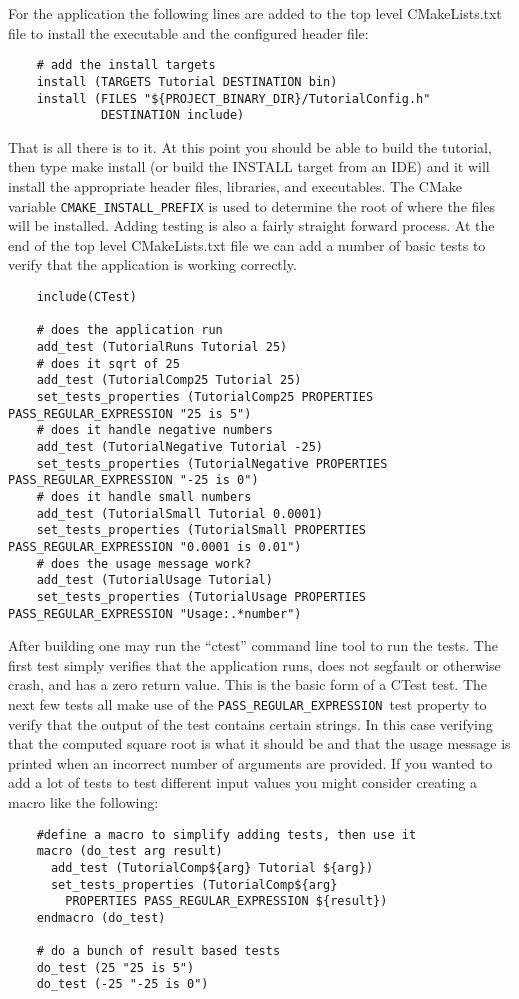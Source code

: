 \documentclass[UTF8,a4paper,8pt]{ctexart}
\begin{document}
	For the application the following lines are added to the top level CMakeLists.txt file to install the executable and the configured header file:
	\begin{lstlisting}
	# add the install targets
	install (TARGETS Tutorial DESTINATION bin)
	install (FILES "${PROJECT_BINARY_DIR}/TutorialConfig.h"        
	         DESTINATION include)
	\end{lstlisting}	

	That is all there is to it. At this point you should be able to build the tutorial, then type make install (or build the INSTALL target from an IDE) and it will install the appropriate header files, libraries, and executables. The CMake variable \verb|CMAKE_INSTALL_PREFIX| is used to determine the root of where the files will be installed. Adding testing is also a fairly straight forward process. At the end of the top level CMakeLists.txt file we can add a number of basic tests to verify that the application is working correctly.
	\begin{lstlisting}
	include(CTest)
	
	# does the application run
	add_test (TutorialRuns Tutorial 25)
	# does it sqrt of 25
	add_test (TutorialComp25 Tutorial 25)
	set_tests_properties (TutorialComp25 PROPERTIES PASS_REGULAR_EXPRESSION "25 is 5")
	# does it handle negative numbers
	add_test (TutorialNegative Tutorial -25)
	set_tests_properties (TutorialNegative PROPERTIES PASS_REGULAR_EXPRESSION "-25 is 0")
	# does it handle small numbers
	add_test (TutorialSmall Tutorial 0.0001)
	set_tests_properties (TutorialSmall PROPERTIES PASS_REGULAR_EXPRESSION "0.0001 is 0.01")
	# does the usage message work?
	add_test (TutorialUsage Tutorial)
	set_tests_properties (TutorialUsage PROPERTIES PASS_REGULAR_EXPRESSION "Usage:.*number")
	\end{lstlisting}	

	
	After building one may run the “ctest” command line tool to run the tests. The first test simply verifies that the application runs, does not segfault or otherwise crash, and has a zero return value. This is the basic form of a CTest test. The next few tests all make use of the \verb|PASS_REGULAR_EXPRESSION |test property to verify that the output of the test contains certain strings. In this case verifying that the computed square root is what it should be and that the usage message is printed when an incorrect number of arguments are provided. If you wanted to add a lot of tests to test different input values you might consider creating a macro like the following:
	\begin{lstlisting}
	#define a macro to simplify adding tests, then use it
	macro (do_test arg result)
	  add_test (TutorialComp${arg} Tutorial ${arg})
	  set_tests_properties (TutorialComp${arg}
	    PROPERTIES PASS_REGULAR_EXPRESSION ${result})
	endmacro (do_test)
	 
	# do a bunch of result based tests
	do_test (25 "25 is 5")
	do_test (-25 "-25 is 0")
	\end{lstlisting}	
\end{document}
